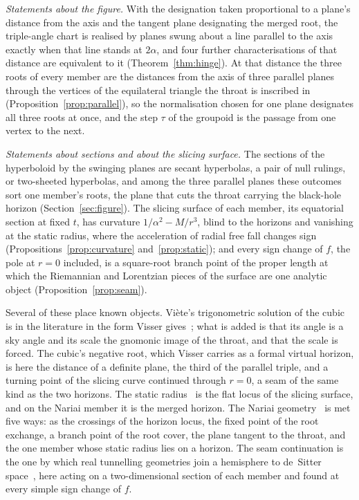 \documentclass[11pt]{article}
\theoremstyle{plain}
\theoremstyle{definition}
\theoremstyle{remark}
\begin{document}
\emph{Statements about the figure.} With the designation taken proportional to a plane's distance from the
axis and the tangent plane designating the merged root, the triple-angle chart is realised by planes swung about
a line parallel to the axis exactly when that line stands at $2\alpha$, and four further characterisations of that
distance are equivalent to it (Theorem~\ref{thm:hinge}). At that distance the three roots of every member are
the distances from the axis of three parallel planes through the vertices of the equilateral triangle the throat
is inscribed in (Proposition~\ref{prop:parallel}), so the normalisation chosen for one plane designates all
three roots at once, and the step $\tau$ of the groupoid is the passage from one vertex to the next.

\emph{Statements about sections and about the slicing surface.} The sections of the hyperboloid by the
swinging planes are secant hyperbolas, a pair of null rulings, or two-sheeted hyperbolas, and among the three
parallel planes these outcomes sort one member's roots, the plane that cuts the throat carrying the black-hole
horizon (Section~\ref{sec:figure}). The slicing surface of each member, its equatorial section at fixed $t$, has
curvature $1/\alpha^{2}-M/r^{3}$, blind to the horizons and vanishing at the static radius, where the acceleration
of radial free fall changes sign (Propositions~\ref{prop:curvature} and~\ref{prop:static}); and every sign change
of $f$, the pole at $r=0$ included, is a square-root branch point of the proper length at which the Riemannian
and Lorentzian pieces of the surface are one analytic object (Proposition~\ref{prop:seam}).

Several of these place known objects. Vi\`ete's trigonometric solution of the cubic is in the literature in the
form Visser gives~\cite{Visser2013}; what is added is that its angle is a sky angle and its scale the gnomonic
image of the throat, and that the scale is forced. The cubic's negative root, which Visser carries as a formal
virtual horizon, is here the distance of a definite plane, the third of the parallel triple, and a turning point
of the slicing curve continued through $r=0$, a seam of the same kind as the two horizons. The static
radius~\cite{StuchlikHledik1999} is the flat locus of the slicing surface, and on the Nariai member it is the
merged horizon. The Nariai geometry~\cite{Nariai1951,GinspargPerry1983} is met five ways: as the crossings of the
horizon locus, the fixed point of the root exchange, a branch point of the root cover, the plane tangent to the
throat, and the one member whose static radius lies on a horizon. The seam continuation is the one by which real
tunnelling geometries join a hemisphere to de~Sitter space~\cite{GibbonsHartle1990}, here acting on a
two-dimensional section of each member and found at every simple sign change of $f$.
\end{document}
